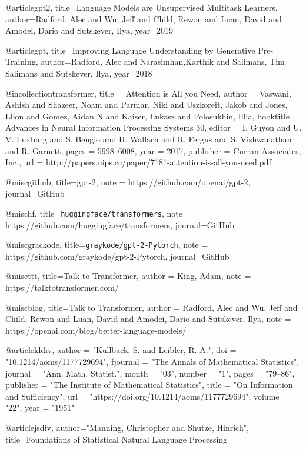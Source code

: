 @article{gpt2,
  title={Language Models are Unsupervised Multitask Learners},
  author={Radford, Alec and Wu, Jeff and Child, Rewon and Luan, David and Amodei, Dario and Sutskever, Ilya},
  year={2019}
}

@article{gpt,
  title={Improving Language Understanding by Generative Pre-Training},
  author={Radford, Alec and Narasimhan,Karthik and Salimans, Tim Salimans and Sutskever, Ilya},
  year={2018}
}

@incollection{transformer,
title = {Attention is All you Need},
author = {Vaswani, Ashish and Shazeer, Noam and Parmar, Niki and Uszkoreit, Jakob and Jones, Llion and Gomez, Aidan N and Kaiser, \L ukasz and Polosukhin, Illia},
booktitle = {Advances in Neural Information Processing Systems 30},
editor = {I. Guyon and U. V. Luxburg and S. Bengio and H. Wallach and R. Fergus and S. Vishwanathan and R. Garnett},
pages = {5998--6008},
year = {2017},
publisher = {Curran Associates, Inc.},
url = {http://papers.nips.cc/paper/7181-attention-is-all-you-need.pdf}
}

@misc{github, 
title={gpt-2}, 
note = {https://github.com/openai/gpt-2}, 
journal={GitHub}}

@misc{hf, 
title={\texttt{huggingface/transformers}}, 
note = {https://github.com/huggingface/transformers}, 
journal={GitHub}}

@misc{grackode, 
title={\texttt{graykode/gpt-2-Pytorch}}, 
note = {https://github.com/graykode/gpt-2-Pytorch}, 
journal={GitHub}}



@misc{ttt, 
title={Talk to Transformer}, 
author = {King, Adam}, 
note = {https://talktotransformer.com/}}


@misc{blog, 
title={Talk to Transformer}, 
author = {Radford, Alec and Wu, Jeff and Child, Rewon and Luan, David and Amodei, Dario and Sutskever, Ilya}, 
note = {https://openai.com/blog/better-language-models/}}

@article{kldiv,
author = "Kullback, S. and Leibler, R. A.",
doi = "10.1214/aoms/1177729694",
fjournal = "The Annals of Mathematical Statistics",
journal = "Ann. Math. Statist.",
month = "03",
number = "1",
pages = "79--86",
publisher = "The Institute of Mathematical Statistics",
title = "On Information and Sufficiency",
url = "https://doi.org/10.1214/aoms/1177729694",
volume = "22",
year = "1951"
}

@article{jsdiv,
author="Manning, Christopher and Shutze, Hinrich",
title={Foundations of Statistical Natural Language Processing}
}

